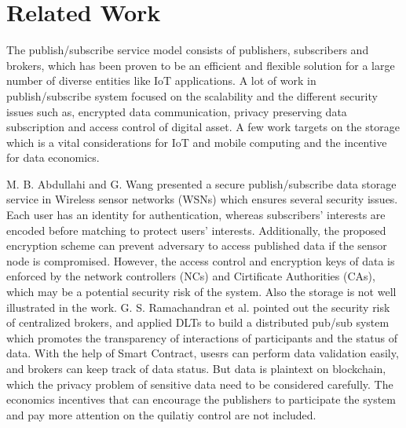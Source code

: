 \documentclass[conference]{IEEEtran}
\begin{document}
\section{Related Work}
The publish/subscribe service model consists of publishers, subscribers and brokers, which has been proven\cite{pubSubAnalysis, pubSubAnalysis2} to be an efficient and flexible solution for a large number of diverse entities like IoT applications. A lot of work in publish/subscribe system focused on the scalability and the different security issues such as, encrypted data communication, privacy preserving data subscription and access control of digital asset. A few work targets on the storage which is a vital considerations for IoT and mobile computing and the incentive for data economics.

M. B. Abdullahi and G. Wang\cite{centralPubSub} presented a secure publish/subscribe data storage service in Wireless sensor networks (WSNs) which ensures several security issues. Each user has an identity for authentication, whereas subscribers' interests are encoded before matching to protect users' interests. Additionally, the proposed encryption scheme can prevent adversary to access published data if the sensor node is compromised. However, the access control and encryption keys of data is enforced by the network controllers (NCs) and Cirtificate Authorities (CAs), which may be a potential security risk of the system. Also the storage is not well illustrated in the work. G. S. Ramachandran et al.\cite{trinity} pointed out the security risk of centralized brokers, and applied DLTs to build a distributed pub/sub system which promotes the transparency of interactions of participants and the status of data. With the help of Smart Contract, usesrs can perform data validation easily, and brokers can keep track of data status. But data is plaintext on blockchain, which the privacy problem of sensitive data need to be considered carefully. The economics incentives that can encourage the publishers to participate the system and pay more attention on the quilatiy control are not included. 
\end{document}
